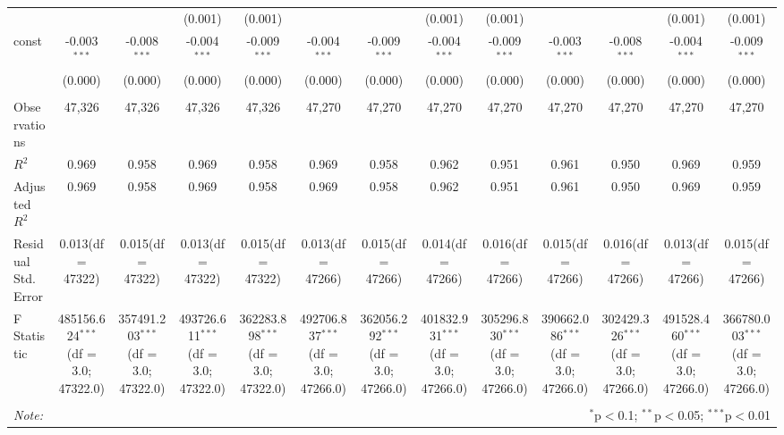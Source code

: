 \begin{table}[!htbp]
\begin{tabular}{@{\extracolsep{5pt}}lcccccccccccc}
  & & & (0.001) & (0.001) & & & (0.001) & (0.001) & & & (0.001) & (0.001) \\
 const & -0.003$^{***}$ & -0.008$^{***}$ & -0.004$^{***}$ & -0.009$^{***}$ & -0.004$^{***}$ & -0.009$^{***}$ & -0.004$^{***}$ & -0.009$^{***}$ & -0.003$^{***}$ & -0.008$^{***}$ & -0.004$^{***}$ & -0.009$^{***}$ \\
  & (0.000) & (0.000) & (0.000) & (0.000) & (0.000) & (0.000) & (0.000) & (0.000) & (0.000) & (0.000) & (0.000) & (0.000) \\
\hline \\[-1.8ex]
 Observations & 47,326 & 47,326 & 47,326 & 47,326 & 47,270 & 47,270 & 47,270 & 47,270 & 47,270 & 47,270 & 47,270 & 47,270 \\
 $R^2$ & 0.969 & 0.958 & 0.969 & 0.958 & 0.969 & 0.958 & 0.962 & 0.951 & 0.961 & 0.950 & 0.969 & 0.959 \\
 Adjusted $R^2$ & 0.969 & 0.958 & 0.969 & 0.958 & 0.969 & 0.958 & 0.962 & 0.951 & 0.961 & 0.950 & 0.969 & 0.959 \\
 Residual Std. Error & 0.013(df = 47322) & 0.015(df = 47322) & 0.013(df = 47322) & 0.015(df = 47322) & 0.013(df = 47266) & 0.015(df = 47266) & 0.014(df = 47266) & 0.016(df = 47266) & 0.015(df = 47266) & 0.016(df = 47266) & 0.013(df = 47266) & 0.015(df = 47266)  \\
 F Statistic & 485156.624$^{***}$ (df = 3.0; 47322.0) & 357491.203$^{***}$ (df = 3.0; 47322.0) & 493726.611$^{***}$ (df = 3.0; 47322.0) & 362283.898$^{***}$ (df = 3.0; 47322.0) & 492706.837$^{***}$ (df = 3.0; 47266.0) & 362056.292$^{***}$ (df = 3.0; 47266.0) & 401832.931$^{***}$ (df = 3.0; 47266.0) & 305296.830$^{***}$ (df = 3.0; 47266.0) & 390662.086$^{***}$ (df = 3.0; 47266.0) & 302429.326$^{***}$ (df = 3.0; 47266.0) & 491528.460$^{***}$ (df = 3.0; 47266.0) & 366780.003$^{***}$ (df = 3.0; 47266.0) \\
\hline
\hline \\[-1.8ex]
\textit{Note:} & \multicolumn{12}{r}{$^{*}$p$<$0.1; $^{**}$p$<$0.05; $^{***}$p$<$0.01} \\
\end{tabular}
\end{table}